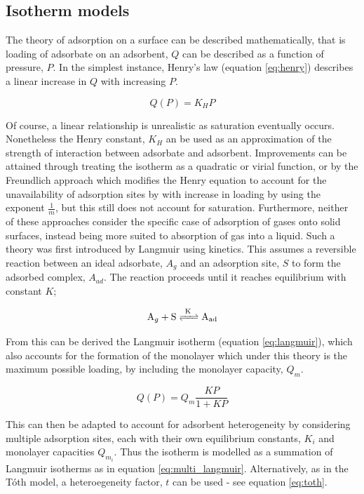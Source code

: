 \subsection{Isotherm models}

The theory of adsorption on a surface can be described mathematically, that is loading of \gls{adsorbate} on an \gls{adsorbent}, $Q$ can be described as a function of pressure, $P$. In the simplest instance, Henry's law\citep{henry1803experiments} (equation \ref{eq:henry}) describes a linear increase in $Q$ with increasing $P$.

\begin{equation}\label{eq:henry}
    Q(P) = K_H P
\end{equation}

Of course, a linear relationship is unrealistic as saturation eventually occurs. Nonetheless the Henry constant, $K_H$ an be used as an approximation of the strength of interaction between \gls{adsorbate} and \gls{adsorbent}. Improvements can be attained through treating the isotherm as a quadratic or virial function, or by the Freundlich approach which modifies the Henry equation to account for the unavailability of adsorption sites by with increase in loading by using the exponent $\frac{1}{m}$, but this still does not account for saturation. Furthermore, neither of these approaches consider the specific case of adsorption of gases onto solid surfaces, instead being more suited to absorption of gas into a liquid. Such a theory was first introduced by Langmuir using kinetics. This assumes a reversible reaction between an ideal \gls{adsorbate}, $A_g$ and an \gls{adsorption} site, $S$ to form the adsorbed complex, $A_{ad}$. The reaction proceeds until it reaches equilibrium with constant $K$;

\begin{equation}
    \ce{A_g + S <=>[K] A_{ad}}
\end{equation}

From this can be derived the Langmuir isotherm (equation \ref{eq:langmuir}), which also accounts for the formation of the monolayer which under this theory is the maximum possible loading, by including the monolayer capacity, $Q_m$.

\begin{equation}\label{eq:langmuir}
    Q(P) = Q_m \frac{K P}{1 + K P}
\end{equation}

This can then be adapted to account for \gls{adsorbent} heterogeneity by considering multiple \gls{adsorption} sites, each with their own equilibrium constants, $K_i$ and monolayer capacities $Q_{m_i}$. Thus the isotherm is modelled as a summation of Langmuir isotherms as in equation \ref{eq:multi_langmuir}. Alternatively, as in the T\'{o}th model, a heteroegeneity factor, $t$ can be used - see equation \ref{eq:toth}. 

